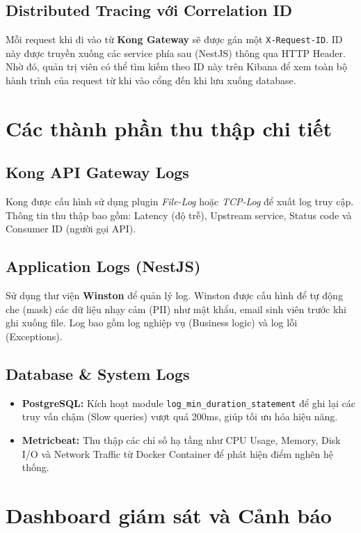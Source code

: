 \subsection{Distributed Tracing với Correlation ID}
Mỗi request khi đi vào từ \textbf{Kong Gateway} sẽ được gán một \texttt{X-Request-ID}. ID này được truyền xuống các service phía sau (NestJS) thông qua HTTP Header. Nhờ đó, quản trị viên có thể tìm kiếm theo ID này trên Kibana để xem toàn bộ hành trình của request từ khi vào cổng đến khi lưu xuống database.

\section{Các thành phần thu thập chi tiết}

\subsection{Kong API Gateway Logs}
Kong được cấu hình sử dụng plugin \textit{File-Log} hoặc \textit{TCP-Log} để xuất log truy cập. Thông tin thu thập bao gồm: Latency (độ trễ), Upstream service, Status code và Consumer ID (người gọi API).

\subsection{Application Logs (NestJS)}
Sử dụng thư viện \textbf{Winston} để quản lý log. Winston được cấu hình để tự động che (mask) các dữ liệu nhạy cảm (PII) như mật khẩu, email sinh viên trước khi ghi xuống file. Log bao gồm log nghiệp vụ (Business logic) và log lỗi (Exceptions).

\subsection{Database \& System Logs}
\begin{itemize}
    \item \textbf{PostgreSQL:} Kích hoạt module \texttt{log\_min\_duration\_statement} để ghi lại các truy vấn chậm (Slow queries) vượt quá 200ms, giúp tối ưu hóa hiệu năng.
    \item \textbf{Metricbeat:} Thu thập các chỉ số hạ tầng như CPU Usage, Memory, Disk I/O và Network Traffic từ Docker Container để phát hiện điểm nghẽn hệ thống.
\end{itemize}

\section{Dashboard giám sát và Cảnh báo}

